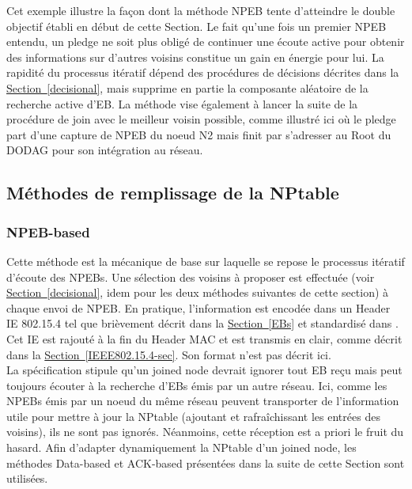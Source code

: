 \documentclass[]{report}
\newcommand{\wordlink}[2]{\hyperref[#2]{#1~\ref{#2}}}
\begin{document}
Cet exemple illustre la façon dont la méthode NPEB tente d'atteindre le double objectif établi en début de cette Section. Le fait qu'une fois un premier NPEB entendu, un pledge ne soit plus obligé de continuer une écoute active pour obtenir des informations sur d'autres voisins constitue un gain en énergie pour lui. La rapidité du processus itératif dépend des procédures de décisions décrites dans la \wordlink{Section}{decisional}, mais supprime en partie la composante aléatoire de la recherche active d'EB. La méthode vise également à lancer la suite de la procédure de join avec le meilleur voisin possible, comme illustré ici  où le pledge part d'une capture de NPEB du noeud N2 mais finit par s'adresser au Root du DODAG pour son intégration au réseau.

\subsection{Méthodes de remplissage de la NPtable}
\label{feed_NPtable}

\subsubsection{NPEB-based}

Cette méthode est la mécanique de base sur laquelle se repose le processus itératif d'écoute des NPEBs. Une sélection des voisins à proposer est effectuée (voir \wordlink{Section}{decisional}, idem pour les deux méthodes suivantes de cette section) à chaque envoi de NPEB. En pratique, l'information est encodée dans un Header IE 802.15.4 tel que brièvement décrit dans la \wordlink{Section}{EBs} et standardisé dans \cite{IEEE802.15.4}. Cet IE est rajouté à la fin du Header MAC et est transmis en clair, comme décrit dans la \wordlink{Section}{IEEE802.15.4-sec}. Son format n'est pas décrit ici.\\

La spécification \cite{rfc8180} stipule qu'un joined node devrait ignorer tout EB reçu mais peut toujours écouter à la recherche d'EBs émis par un autre réseau. Ici, comme les NPEBs émis par un noeud du même réseau peuvent transporter de l'information utile pour mettre à jour la NPtable (ajoutant et rafraîchissant les entrées des voisins), ils ne sont pas ignorés. Néanmoins, cette réception est a priori le fruit du hasard. Afin d'adapter dynamiquement la NPtable d'un joined node, les méthodes Data-based et ACK-based présentées dans la suite de cette Section sont utilisées.
\end{document}
